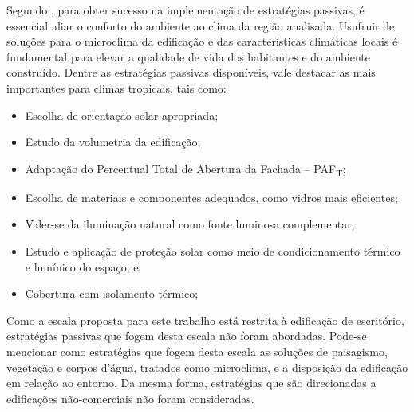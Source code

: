 Segundo \textcite{Noguchi2016}, para obter sucesso na implementação de estratégias passivas, é essencial aliar o conforto do ambiente ao clima da região analisada. Usufruir de soluções para o microclima da edificação e das características climáticas locais é fundamental para elevar a qualidade de vida dos habitantes e do ambiente construído. Dentre as estratégias passivas disponíveis, vale destacar as mais importantes para climas tropicais, tais como:
    \begin{itemize}
        \item Escolha de orientação solar apropriada;
        \item Estudo da volumetria da edificação;
        \item Adaptação do Percentual Total de Abertura da Fachada – PAF\textsubscript{T};
        \item Escolha de materiais e componentes adequados, como vidros mais eficientes;
        \item Valer-se da iluminação natural como fonte luminosa complementar;
        \item Estudo e aplicação de proteção solar como meio de condicionamento térmico e lumínico do espaço; e
        \item Cobertura com isolamento térmico;    
    \end{itemize}
Como a escala proposta para este trabalho está restrita à edificação de escritório, estratégias passivas que fogem desta escala não foram abordadas. Pode-se mencionar como estratégias que fogem desta escala as soluções de paisagismo, vegetação e corpos d’água, tratados como microclima, e a disposição da edificação em relação ao entorno. Da mesma forma, estratégias que são direcionadas a edificações não-comerciais não foram consideradas.
